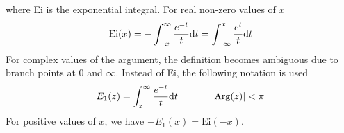 \documentclass[article,11pt]{elegantpaper}
\begin{document}
where Ei is the exponential integral. For real non-zero values of $x$
$$ \text{Ei}(x) = - \int_{-x}^\infty \frac{e^{-t}}{t} \mathrm{d}t  = \int_{-\infty}^x \frac{e^{t}}{t} \mathrm{d}t $$
For complex values of the argument, the definition becomes ambiguous due to branch points at $0$ and $\infty$. Instead of Ei, the following notation is used
$$ E_1 (z) = \int_z^\infty \frac{e^{-t}}{t} \mathrm{d}t \ \ \ \ \ \ \ \ \ \  \left\vert \mathrm{Arg} (z) \right\vert < \pi $$
For positive values of $x$, we have $-E_1 (x) = \text{Ei} (-x) $. %



\end{document}
